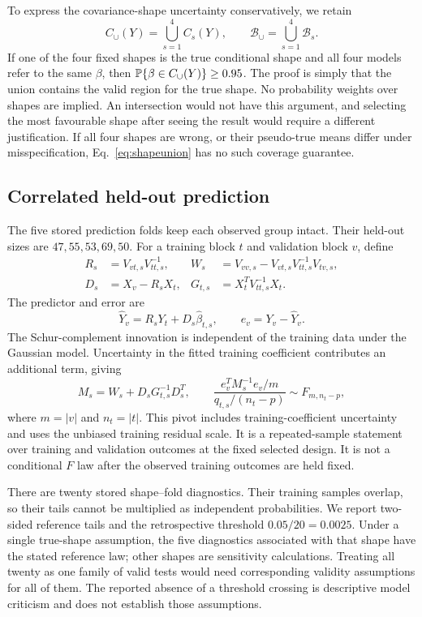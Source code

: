To express the covariance-shape uncertainty conservatively, we retain
\begin{equation}
 C_\cup(Y)=\bigcup_{s=1}^{4}C_s(Y),\qquad
 \mathcal B_\cup=\bigcup_{s=1}^{4}\mathcal B_s.
 \label{eq:shapeunion}
\end{equation}
If one of the four fixed shapes is the true conditional shape and all four models refer to the same $\beta$, then $\mathbb P\{\beta\in C_\cup(Y)\}\geq0.95$. The proof is simply that the union contains the valid region for the true shape. No probability weights over shapes are implied. An intersection would not have this argument, and selecting the most favourable shape after seeing the result would require a different justification. If all four shapes are wrong, or their pseudo-true means differ under misspecification, Eq.~\eqref{eq:shapeunion} has no such coverage guarantee.

\subsection{Correlated held-out prediction}

The five stored prediction folds keep each observed group intact. Their held-out sizes are $47,55,53,69,50$. For a training block $t$ and validation block $v$, define
\begin{align}
 R_s&=V_{vt,s}V_{tt,s}^{-1},&
 W_s&=V_{vv,s}-V_{vt,s}V_{tt,s}^{-1}V_{tv,s},\nonumber\\
 D_s&=X_v-R_sX_t,& G_{t,s}&=X_t^TV_{tt,s}^{-1}X_t.
 \label{eq:foldblocks}
\end{align}
The predictor and error are
\begin{equation}
 \widehat Y_v=R_sY_t+D_s\widehat\beta_{t,s},\qquad
 e_v=Y_v-\widehat Y_v.
 \label{eq:predictor}
\end{equation}
The Schur-complement innovation is independent of the training data under the Gaussian model. Uncertainty in the fitted training coefficient contributes an additional term, giving
\begin{equation}
 M_s=W_s+D_sG_{t,s}^{-1}D_s^T,\qquad
 \frac{e_v^TM_s^{-1}e_v/m}{q_{t,s}/(n_t-p)}\sim F_{m,n_t-p},
 \label{eq:predf}
\end{equation}
where $m=|v|$ and $n_t=|t|$. This pivot includes training-coefficient uncertainty and uses the unbiased training residual scale. It is a repeated-sample statement over training and validation outcomes at the fixed selected design. It is not a conditional $F$ law after the observed training outcomes are held fixed.

There are twenty stored shape--fold diagnostics. Their training samples overlap, so their tails cannot be multiplied as independent probabilities. We report two-sided reference tails and the retrospective threshold $0.05/20=0.0025$. Under a single true-shape assumption, the five diagnostics associated with that shape have the stated reference law; other shapes are sensitivity calculations. Treating all twenty as one family of valid tests would need corresponding validity assumptions for all of them. The reported absence of a threshold crossing is descriptive model criticism and does not establish those assumptions.
